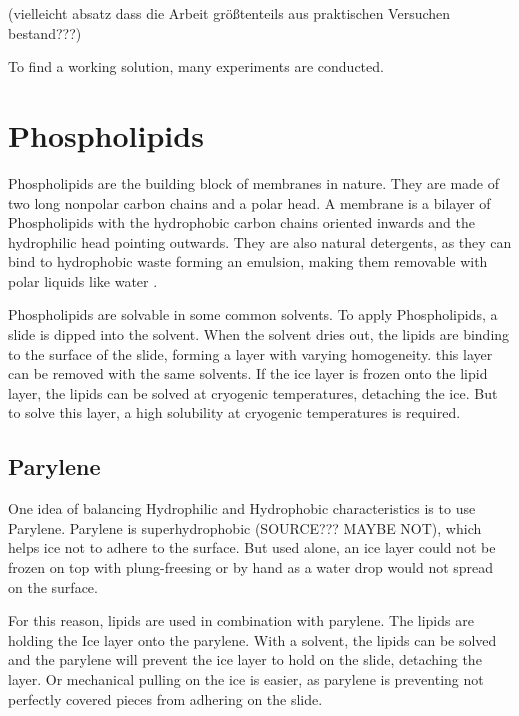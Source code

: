 
(vielleicht absatz dass die Arbeit größtenteils aus praktischen Versuchen bestand???)

To find a working solution, many experiments are conducted. 

\section{Phospholipids}
\label{section:metodeLipide}

Phospholipids are the building block of membranes in nature. They are made of two long nonpolar carbon chains and a polar head. A membrane is a bilayer of Phospholipids with the hydrophobic carbon chains oriented inwards and the hydrophilic head pointing outwards. They are also natural detergents, as they can bind to hydrophobic waste forming an emulsion, making them removable with polar liquids like water \cite{SriramaM.BhairiPh.D..}.

Phospholipids are solvable in some common solvents. To apply Phospholipids, a slide is dipped into the solvent. When the solvent dries out, the lipids are binding to the surface of the slide, forming a layer with varying homogeneity. this layer can be removed with the same solvents. If the ice layer is frozen onto the lipid layer, the lipids can be solved at cryogenic temperatures, detaching the ice. But to solve this layer, a high solubility at cryogenic temperatures is required. 


\subsection{Parylene}

One idea of balancing Hydrophilic and Hydrophobic characteristics is to use Parylene. Parylene is superhydrophobic (SOURCE??? MAYBE NOT), which helps ice not to adhere to the surface. But used alone, an ice layer could not be frozen on top with plung-freesing or by hand as a water drop would not spread on the surface. 

For this reason, lipids are used in combination with parylene. The lipids are holding the Ice layer onto the parylene. With a solvent, the lipids can be solved and the parylene will prevent the ice layer to hold on the slide, detaching the layer. Or mechanical pulling on the ice is easier, as parylene is preventing not perfectly covered pieces from adhering on the slide.


